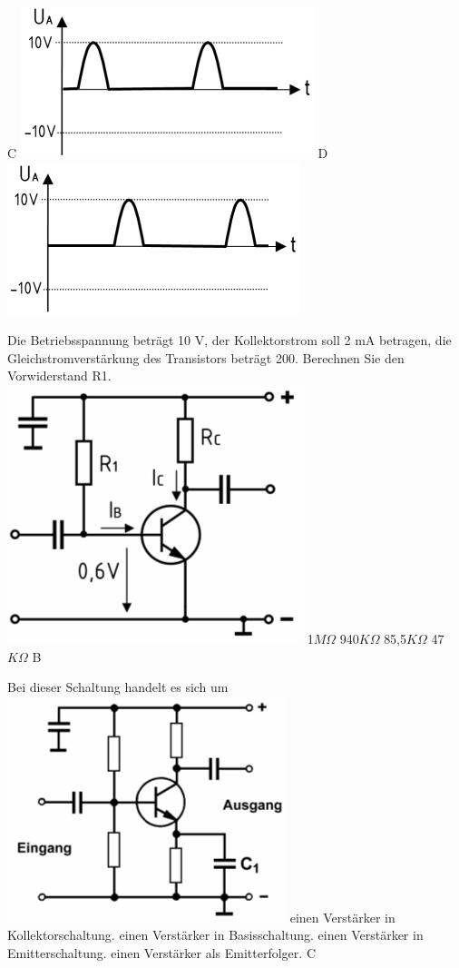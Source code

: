 {	C \includegraphics[scale=0.3]{Transistor/Bilder/TD431_C.png}
	D \includegraphics[scale=0.3]{Transistor/Bilder/TD431_D.png}
	}

\vspace*{0.65cm}

{Die Betriebsspannung beträgt 10 V, der Kollektorstrom soll 2 mA betragen, die Gleichstromverstärkung des Transistors beträgt 200. Berechnen Sie den Vorwiderstand R1.\\
\includegraphics[scale=0.4]{Transistor/Bilder/TC618.png}
}%
{1$M\Omega$}%
{940$K\Omega$}%
{85,5$K\Omega$}%
{47$K\Omega$}%
{B}%

{Bei dieser Schaltung handelt es sich um\\
\includegraphics[scale=0.4]{Transistor/Bilder/TD403.png}
}%
{einen Verstärker in Kollektorschaltung.}%
{einen Verstärker in Basisschaltung.}%
{einen Verstärker in Emitterschaltung.}%
{einen Verstärker als Emitterfolger.}%
{C}%

